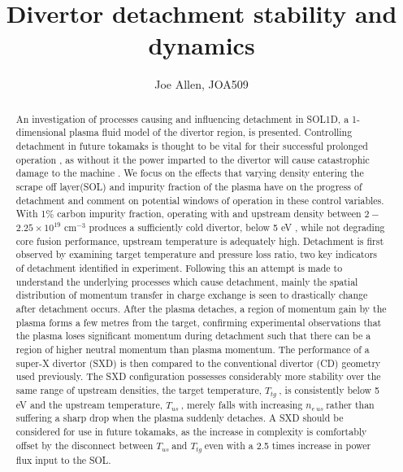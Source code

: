 \documentclass[12pt]{article}  %
\providecommand{\noNe}[1]{{${#1}\times 10^{19}$ cm$^{-3}$}} %
\providecommand{\neus}{$n_{e~us}~$} %
\providecommand{\Tus}{$T_{us}~$} %
\providecommand{\Ttg}{$T_{tg}~$} %
\begin{document}
\title{Divertor detachment stability and dynamics}
\author{Joe Allen, JOA509}

\maketitle
\newpage
\begin{abstract}
\noindent An investigation of processes causing and influencing detachment in SOL1D, a 1-dimensional plasma fluid model of the divertor region, is presented. Controlling detachment in future tokamaks is thought to be vital for their successful prolonged operation \cite{Reimold2015}, as without it the power imparted to the divertor will cause catastrophic damage to the machine \cite{Loarte2007}. We focus on the effects that varying density entering the scrape off layer(SOL) and impurity fraction of the plasma have on the progress of detachment and comment on potential windows of operation in these control variables. With 1\% carbon impurity fraction, operating with and upstream density between $2 -$ \noNe{2.25} produces a sufficiently cold divertor, below 5 eV \cite{Porter1996}, while not degrading core fusion performance, upstream temperature is adequately high. Detachment is first observed by examining target temperature and pressure loss ratio, two key indicators of detachment identified in experiment. Following this an attempt is made to understand the underlying processes which cause detachment, mainly the spatial distribution of momentum transfer in charge exchange is seen to drastically change after detachment occurs. After the plasma detaches, a region of momentum gain by the plasma forms a few metres from the target, confirming experimental observations \cite{Loarte1998, Wischmeier2009} that the plasma loses significant momentum during detachment such that there can be a region of higher neutral momentum than plasma momentum. The performance of a super-X divertor (SXD) is then compared to the conventional divertor (CD) geometry used previously. The SXD configuration possesses considerably more stability over the same range of upstream densities, the target temperature, \Ttg, is consistently below 5 eV and the upstream temperature, \Tus, merely falls with increasing \neus rather than suffering a sharp drop when the plasma suddenly detaches. A SXD should be considered for use in future tokamaks, as the increase in complexity is comfortably offset by the disconnect between \Tus and \Ttg even with a 2.5 times increase in power flux input to the SOL.
\end{abstract}
\end{document}
